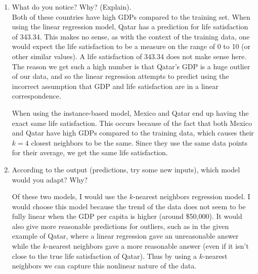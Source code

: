 \documentclass[a4paper,10pt]{article}
\begin{document}
\begin{enumerate}
\begin{enumerate}
		\item What do you notice? Why? (Explain). \\
			Both of these countries have high GDPs compared to the training set.
			When using the linear regression model, Qatar has a prediction for life satisfaction of 343.34.
			This makes no sense, as with the context of the training data, one would expect the life satisfaction to be a measure on the range of 0 to 10 (or other similar values).
			A life satisfaction of 343.34 does not make sense here.
			The reason we get such a high number is that Qatar's GDP is a huge outlier of our data, and so the linear regression attempts to predict using the incorrect assumption that GDP and life satisfaction are in a linear correspondence.
			
			When using the instance-based model, Mexico and Qatar end up having the exact same life satisfaction.
			This occurs because of the fact that both Mexico and Qatar have high GDPs compared to the training data, which causes their \( k=4 \) closest neighbors to be the same.
			Since they use the same data points for their average, we get the same life satisfaction.
			
		\item According to the output (predictions, try some new inputs), which model would you adapt? Why?
		
		Of these two models, I would use the \( k \)-nearest neighbors regression model. 
		I would choose this model because the trend of the data does not seem to be fully linear when the GDP per capita is higher (around \$50,000).
		It would also give more reasonable predictions for outliers, such as in the given example of Qatar, where a linear regression gave an unreasonable answer while the \( k \)-nearest neighbors gave a more reasonable answer (even if it isn't close to the true life satisfaction of Qatar).
		Thus by using a \( k \)-nearest neighbors we can capture this nonlinear nature of the data.
	\end{enumerate}
	

\end{enumerate}
\end{document}
